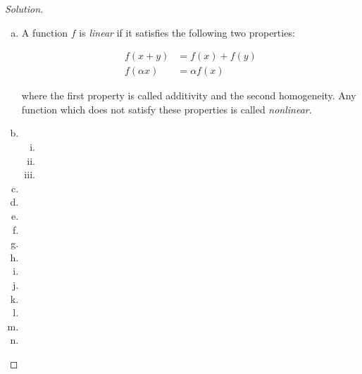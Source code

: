 \documentclass[12pt,a4]{article}
\theoremstyle{definition}
\begin{document}
\begin{proof}[Solution]
	\begin{enumerate}[(a)]
		\item A function $f$ is \emph{linear} if it satisfies the following two properties: 
		
		\begin{align*}
		f(x + y) &= f(x) + f(y) \\
		f(\alpha x) &= \alpha f(x) 
		\end{align*}
		
		where the first property is called additivity and the second homogeneity. Any function which does not satisfy these properties is called \emph{nonlinear}. 
		
		\item 
		\begin{enumerate}[(i)]
			\item 
			
			\item 
			
			\item 
		\end{enumerate}
		
		\item 
		
		\item 
		
		\item 
		
		\item 
		
		\item 
		
		\item 
		
		\item 
		
		\item 
		
		\item 
		
		\item 
		
		\item 
		
		\item 
	\end{enumerate}
\end{proof}
\end{document}
